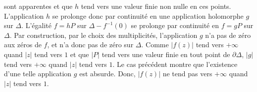 {\begin{enumerate}
{ sont apparentes et que $h$ tend vers une valeur finie non nulle en ces points. L'application $h$ se prolonge donc par continuité en une application holomorphe $g$ sur $\Delta$. 
 L'égalité $f=hP$ sur $\Delta-f^{-1}(0)$ se prolonge par continuité en $f=gP$ sur $\Delta$.
 Par construction, par le choix des multiplicités, l'application $g$ n'a pas de zéro aux zéros de $f$, et n'a donc pas de zéro sur $\Delta$.
 Comme $|f(z)|$ tend vers $+\infty$ quand $|z|$ tend vers $1$ et que $|P|$ tend vers une valeur finie en tout point de $\partial\Delta$, $|g|$ tend vers $+\infty$ quand $|z|$ tend vers $1$. Le cas précédent montre que l'existence d'une telle application $g$ est absurde.
 Donc, $|f(z)|$ ne tend pas vers $+\infty$ quand $|z|$ tend vers $1$.}
\end{enumerate}
}